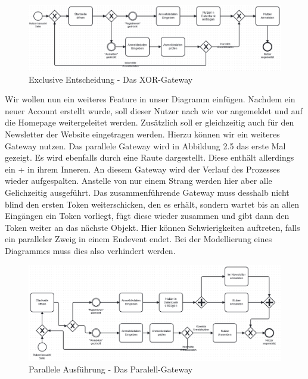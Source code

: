 \begin{figure}
\centering
\includegraphics[scale=0.5]{Figures/Beispiel5}
\decoRule
\caption[XOR-Gateway]{Exclusive Entscheidung - Das XOR-Gateway}
\label{fig:Task}
\end{figure}


Wir wollen nun ein weiteres Feature in unser Diagramm einfügen. Nachdem ein neuer Account erstellt wurde, soll dieser Nutzer nach wie vor angemeldet und auf die Homepage weitergeleitet werden. Zusätzlich soll er gleichzeitig auch für den Newsletter der Website eingetragen werden. Hierzu können wir ein weiteres Gateway nutzen. Das parallele Gateway wird in Abbildung 2.5 das erste Mal gezeigt. Es wird ebenfalls durch eine Raute dargestellt. Diese enthält allerdings ein + in ihrem Inneren. An diesem Gateway wird der Verlauf des Prozesses wieder aufgespalten. Anstelle von nur einem Strang werden hier aber alle Gelichzeitig ausgeführt. Das zusammenführende Gateway muss desshalb nicht blind den ersten Token weiterschicken, den es erhält, sondern wartet bis an allen Eingängen ein Token vorliegt, fügt diese wieder zusammen und gibt dann den Token weiter an das nächste Objekt. Hier können Schwierigkeiten auftreten, falls ein paralleler Zweig in einem Endevent endet. Bei der Modellierung eines Diagrammes muss dies also verhindert werden. 
\begin{figure}
\centering
\includegraphics[scale=0.5]{Figures/Beispiel6}
\decoRule
\caption[Paralell-Gateway]{Parallele Ausführung - Das Paralell-Gateway}
\label{fig:Task}
\end{figure}

